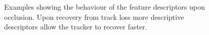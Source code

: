 \begin{figure}[t]
	\vspace{2mm}
\centerline{%
	}
	\vspace{-2mm}
\centerline{%
	}
\caption{Examples showing the behaviour of the feature descriptors upon occlusion. Upon recovery from track loss more descriptive descriptors allow the tracker to recover faster.}
\vspace{-3mm}
\label{fig:tracking_results}
\end{figure}


